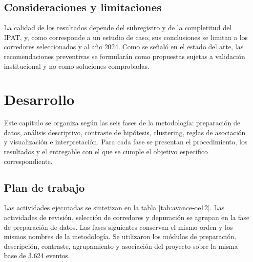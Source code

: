 \documentclass[12pt,letterpaper]{article}
\begin{document}
\hypertarget{consideraciones-y-limitaciones}{%
\subsection{Consideraciones y
limitaciones}\label{consideraciones-y-limitaciones}}

La calidad de los resultados depende del subregistro y de la
completitud del IPAT, y, como corresponde a un estudio de caso, sus
conclusiones se limitan a los corredores seleccionados y al año 2024. Como se señaló en el estado del arte, las
recomendaciones preventivas se formularán como propuestas sujetas a
validación institucional y no como soluciones comprobadas.

\clearpage
\hypertarget{desarrollo}{%
\section{Desarrollo}\label{desarrollo}}

Este capítulo se organiza según las seis fases de la metodología:
preparación de datos, análisis descriptivo, contraste de hipótesis,
clustering, reglas de asociación y visualización e interpretación.
Para cada fase se presentan el procedimiento, los resultados y el
entregable con el que se cumple el objetivo específico correspondiente.

\hypertarget{plan-de-trabajo}{%
\subsection*{Plan de trabajo}\label{plan-de-trabajo}}

Las actividades ejecutadas se sintetizan en la tabla
\ref{tab:avance-oe12}. Las actividades de revisión, selección de corredores y depuración se
agrupan en la fase de preparación de datos. Las fases siguientes
conservan el mismo orden y los mismos nombres de la metodología. Se utilizaron los
módulos de preparación, descripción, contraste, agrupamiento y asociación
del proyecto sobre la misma base de 3.624 eventos.
\end{document}

